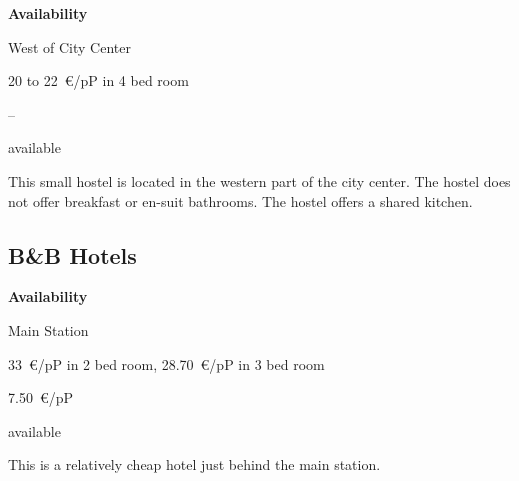 \begin{labeling}{\bf Availability}
  \item[\bf Location] West of City Center
  \item[\bf Price] \num{20} to \SI{22}{\euro/{pP}} in 4 bed room
  \item[\bf Breakfast] –
  \item[\bf Availability] available
\end{labeling}

This small hostel is located in the western part of the city center. The hostel
does not offer breakfast or en-suit bathrooms. The hostel offers a shared
kitchen.

\subsection{B\&B Hotels}

\begin{labeling}{\bf Availability}
  \item[\bf Location] Main Station
  \item[\bf Price] \SI{33}{\euro/{pP}} in 2 bed room, \SI{28.70}{\euro/{pP}} in 3 bed room
  \item[\bf Breakfast] \SI{7,50}{\euro/{pP}}
  \item[\bf Availability] available
\end{labeling}

This is a relatively cheap hotel just behind the main station.


\newpage
